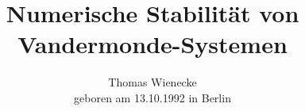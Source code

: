 \newcommand{\documenttitle}{\textbf\LARGE Numerische Stabilität von Vandermonde-Systemen}
\title{\documenttitle}
\author{Thomas Wienecke\\
    \normalsize geboren am 13.10.1992 in Berlin
}
\date{}
\maketitle
%
%
%
%
%
%
%
\newpage
{}

